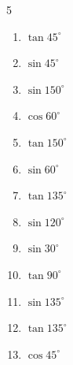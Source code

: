 \begin{multicols}{5}
\begin{enumerate}
  \item $\displaystyle \tan{45^\circ}$

        \phantom{$\displaystyle =1$}

  \item $\displaystyle \sin{45^\circ}$


  \item $\displaystyle \sin{150^\circ}$


\columnbreak %

  \item $\displaystyle \cos{60^\circ}$


  \item $\displaystyle \tan{150^\circ}$


  \item $\displaystyle \sin{60^\circ}$


  \item $\displaystyle \tan{135^\circ}$

        \phantom{$\displaystyle =-1$}

  \item $\displaystyle \sin{120^\circ}$


  \item $\displaystyle \sin{30^\circ}$


  \item $\displaystyle \tan{90^\circ}$

        \phantom{$\displaystyle なし$}

  \item $\displaystyle \sin{135^\circ}$


  \item $\displaystyle \tan{135^\circ}$

        \phantom{$\displaystyle =-1$}

  \item $\displaystyle \cos{45^\circ}$


\end{enumerate}
\end{multicols}
